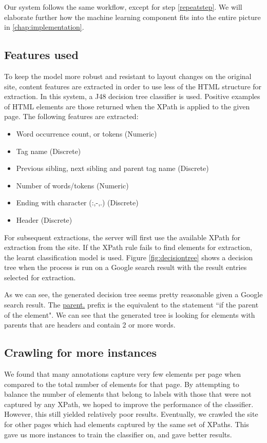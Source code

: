 Our system follows the same workflow, except for step \ref{repeatstep}. We will elaborate further
how the machine learning component fits into the entire picture in \ref{chap:implementation}.

\subsection{Features used}
To keep the model more robust and resistant to layout changes on the original site, content features are extracted in order to use less of the HTML structure for extraction. In this system, a J48 decision tree classifier is used. Positive examples of HTML elements are those returned when the XPath is applied to the given page. The following features are extracted:

	\begin{itemize}
		\item Word occurrence count, or tokens (Numeric)
		\item Tag name (Discrete)
		\item Previous sibling, next sibling and parent tag name (Discrete)
		\item Number of words/tokens (Numeric)
		\item Ending with character (:,-,.) (Discrete)
		\item Header (Discrete)
	\end{itemize}
	

	
	
	For subsequent extractions, the server will first use the available XPath for extraction from the site.
	If the XPath rule fails to find elements for extraction, the learnt classification model is used. Figure
	\ref{fig:decisiontree} shows a decision tree when the process is run on a Google search result with the
	result entries selected for extraction.


	
	As we can see, the generated decision tree seems pretty reasonable given a Google search result. The
	\url{parent.}	prefix is the equivalent to the statement ``if the parent of the element". We can see
	that the generated tree is looking for elements with parents that are headers and contain 2 or more words.
	
\subsection{Crawling for more instances}
	We found that many annotations capture very few elements per page when compared to the total number of elements for that page. By attempting to balance the number of elements that belong to labels with those that were not captured by any XPath, we hoped to improve the performance of the classifier. However, this still yielded relatively poor results. Eventually, we crawled the site for other pages which had elements captured by the same set of XPaths. This gave us more instances to train the classifier on, and gave better results.
	
